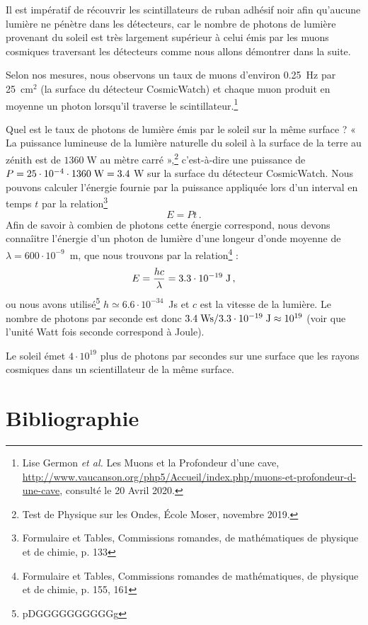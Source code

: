 \documentclass[a4paper, 12pt]{article}
\begin{document}
\begin{spacing}{1.5}
Il est impératif de récouvrir les scintillateurs de ruban adhésif noir afin qu'aucune lumière ne pénètre dans les détecteurs, car le nombre de photons de lumière provenant du soleil est très largement supérieur à celui émis par les muons cosmiques traversant les détecteurs comme nous allons démontrer dans la suite. 

Selon nos mesures, nous observons un taux de muons d'environ 0.25~Hz par 25~cm$^2$ (la surface du détecteur CosmicWatch) et chaque muon produit en moyenne un photon lorsqu'il traverse le scintillateur.\footnote{Lise Germon \emph{et al.} Les Muons et la Profondeur d'une cave, \url{http://www.vaucanson.org/php5/Accueil/index.php/muons-et-profondeur-d-une-cave}, consulté le 20 Avril 2020.} 

Quel est le taux de photons de lumière émis par le soleil sur la même surface ? « La puissance lumineuse de la lumière naturelle du soleil à la surface de la terre au zénith est de $1360\;$W au mètre carré »,\footnote{Test de Physique sur les Ondes, École Moser, novembre 2019.} c'est-à-dire une puissance de $P=25\cdot10^{-4}\cdot1360\;{\rm W}=3.4\;$W sur la surface du détecteur CosmicWatch. Nous pouvons calculer l'énergie fournie par la puissance appliquée lors d'un interval en temps $t$ par la relation\footnote{Formulaire et Tables, Commissions romandes, de mathématiques de physique et de chimie, p. 133} 
\begin{equation}
E = Pt \label{eq:energiepuissance}\,.
\end{equation}
Afin de savoir à combien de photons cette énergie correspond, nous devons connaîitre l'énergie d'un photon de lumière d'une longeur d'onde moyenne de $\lambda = 600\cdot10^{-9}$~m, que nous trouvons par la relation\footnote{Formulaire et Tables, Commissions romandes de mathématiques, de physique et de chimie, p. 155, 161} : 
\begin{equation}
E =\frac{hc}{\lambda} = 3.3\cdot10^{-19}\;{\rm J}\,,
\end{equation}
ou nous avons utilisé\footnote{pDGGGGGGGGGGg} $h\simeq6.6\cdot10^{-34}$~Js et $c$ est la vitesse de la lumière. Le nombre de photons par seconde est donc  $3.4\;{\rm Ws}/3.3\cdot10^{-19}\;{\rm J}\approx10^{19}$ (voir que l'unité Watt fois seconde correspond à Joule).

Le soleil émet $4\cdot10^{19}$ plus de photons par secondes sur une surface que les rayons cosmiques dans un scientillateur de la même surface. 


\pagebreak

\section{Bibliographie}

\end{spacing}
\end{document}
